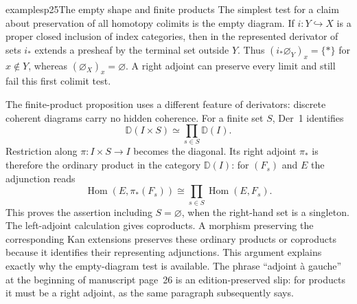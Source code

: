 \begin{dcomment}{examples}{p25}{The empty shape and finite products}
The simplest test for a claim about preservation of all homotopy colimits
is the empty diagram. If $i:Y\hookrightarrow X$ is a proper closed
inclusion of index categories, then in the represented derivator of sets
$i_*$ extends a presheaf by the terminal set outside $Y$. Thus
$(i_*\varnothing_Y)_x=\{*\}$ for $x\notin Y$, whereas
$(\varnothing_X)_x=\varnothing$. A right adjoint can preserve every limit
and still fail this first colimit test.

The finite-product proposition uses a different feature of derivators:
discrete coherent diagrams carry no hidden coherence. For a finite set
$S$, Der~1 identifies
\[
 \mathbb D(I\times S)\simeq\prod_{s\in S}\mathbb D(I).
\]
Restriction along $\pi:I\times S\to I$ becomes the diagonal. Its right
adjoint $\pi_*$ is therefore the ordinary product in the category
$\mathbb D(I)$: for $(F_s)$ and $E$ the adjunction reads
\[
 \operatorname{Hom}(E,\pi_*(F_s))
 \cong\prod_{s\in S}\operatorname{Hom}(E,F_s).
\]
This proves the assertion including $S=\varnothing$, when the right-hand
set is a singleton. The left-adjoint calculation gives coproducts. A
morphism preserving the corresponding Kan extensions preserves these
ordinary products or coproducts because it identifies their representing
adjunctions. This argument explains exactly why the empty-diagram test is
available. The phrase ``adjoint \`a gauche'' at the beginning of manuscript
page~26 is an edition-preserved slip: for products it must be a right
adjoint, as the same paragraph subsequently says.
\end{dcomment}

